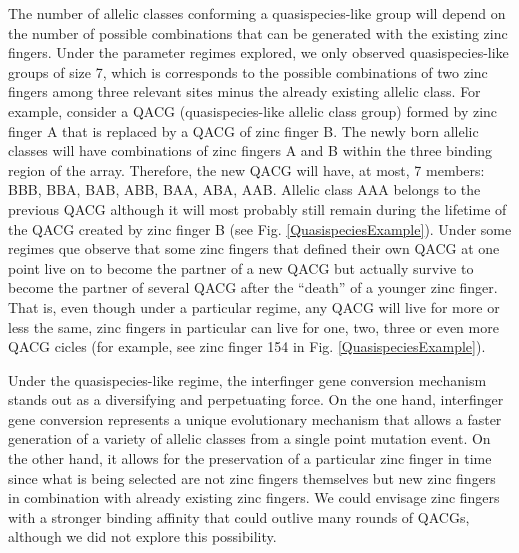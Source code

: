 \documentclass[a4paper,10pt]{article}
\begin{document}
The number of allelic classes conforming a quasispecies-like group will depend on the number of possible combinations that can be generated with the existing zinc fingers. Under the parameter regimes explored, we only observed quasispecies-like groups of size 7, which is corresponds to the possible combinations of two zinc fingers among three relevant sites minus the already existing allelic class. For example, consider a QACG (quasispecies-like allelic class group) formed by zinc finger A that is replaced by a QACG of zinc finger B. The newly born allelic classes  will have combinations of zinc fingers A and B within the three binding region of the array. Therefore, the new QACG will have, at most, 7 members: BBB, BBA, BAB, ABB, BAA, ABA, AAB. Allelic class AAA belongs to the previous QACG although it will most probably still remain during the lifetime of the QACG created by zinc finger B (see Fig. \ref{QuasispeciesExample}).
Under some regimes que observe that some zinc fingers that defined their own QACG at one point live on to become the partner of a new QACG but actually survive to become the partner of several QACG after the ``death'' of a younger zinc finger. That is, even though under a particular regime, any QACG will live for more or less the same, zinc fingers in particular can live for one, two, three or even more QACG cicles (for example, see zinc finger 154 in Fig. \ref{QuasispeciesExample}).

Under the quasispecies-like regime, the interfinger gene conversion mechanism stands out as a diversifying and perpetuating force. On the one hand, interfinger gene conversion represents a unique evolutionary mechanism that allows a faster generation of a variety of allelic classes from a single point mutation event. On the other hand, it allows for the preservation of a particular zinc finger in time since what is being selected are not zinc fingers themselves but new zinc fingers in combination with already existing zinc fingers. 
We could envisage zinc fingers with a stronger binding affinity that could outlive many rounds of QACGs, although we did not explore this possibility. 
\end{document}
